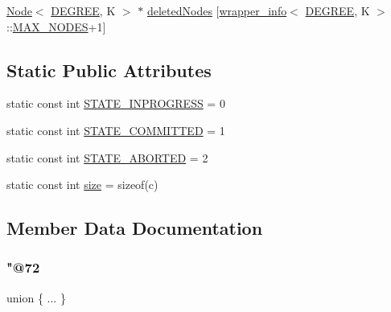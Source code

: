 \begin{DoxyCompactItemize}
\item 
\hyperlink{structbslack__ns_1_1Node}{Node}$<$ \hyperlink{brown__sigouin__abtree__kcas_2adapter_8h_a5d88b17d70c985f2f2b8e987037fd6dd}{D\+E\+G\+R\+EE}, K $>$ $\ast$ \hyperlink{structbslack__ns_1_1SCXRecord_a1a64afaf954a475278a0400bd8fe45c3}{deleted\+Nodes} \mbox{[}\hyperlink{classbslack__ns_1_1wrapper__info}{wrapper\+\_\+info}$<$ \hyperlink{brown__sigouin__abtree__kcas_2adapter_8h_a5d88b17d70c985f2f2b8e987037fd6dd}{D\+E\+G\+R\+EE}, K $>$\+::\hyperlink{scxrecord_8h_abd2aacdca9cb2a1a30f3392256b96ea3}{M\+A\+X\+\_\+\+N\+O\+D\+ES}+1\mbox{]}
\end{DoxyCompactItemize}
\subsection*{Static Public Attributes}
\begin{DoxyCompactItemize}
\item 
static const int \hyperlink{structbslack__ns_1_1SCXRecord_a9c79774eb447ccf468b1422272ed17ef}{S\+T\+A\+T\+E\+\_\+\+I\+N\+P\+R\+O\+G\+R\+E\+SS} = 0
\item 
static const int \hyperlink{structbslack__ns_1_1SCXRecord_add6be2636d8e0da7cbef46457ba9d5a0}{S\+T\+A\+T\+E\+\_\+\+C\+O\+M\+M\+I\+T\+T\+ED} = 1
\item 
static const int \hyperlink{structbslack__ns_1_1SCXRecord_add0428c9ceca3a9b0366ebf51127e888}{S\+T\+A\+T\+E\+\_\+\+A\+B\+O\+R\+T\+ED} = 2
\item 
static const int \hyperlink{structbslack__ns_1_1SCXRecord_aca1833c75f8ede1572771c4d4f6776ab}{size} = sizeof(c)
\end{DoxyCompactItemize}


\subsection{Member Data Documentation}
\mbox{\label{structbslack__ns_1_1SCXRecord_aaf961181507d82c1e35d31993c33ba8d}} 
\subsubsection{\texorpdfstring{"@72}{@72}}
{\footnotesize\ttfamily union \{ ... \} }

\mbox{\label{structbslack__ns_1_1SCXRecord_aa16b6644e2f456ed9330846ebc7b0804}} 
